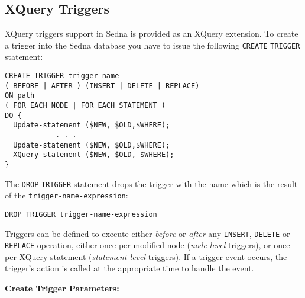 \documentclass[a4paper,12pt]{article}
\begin{document}
\subsection{XQuery Triggers}

XQuery triggers support in Sedna is provided as an XQuery extension. To create a
trigger into the Sedna database you have to issue the following \verb!CREATE!
\verb!TRIGGER! statement:

\begin{verbatim}
CREATE TRIGGER trigger-name
( BEFORE | AFTER ) (INSERT | DELETE | REPLACE)
ON path
( FOR EACH NODE | FOR EACH STATEMENT )
DO {
  Update-statement ($NEW, $OLD,$WHERE);
            . . .
  Update-statement ($NEW, $OLD,$WHERE);
  XQuery-statement ($NEW, $OLD, $WHERE);
}
\end{verbatim}

The \verb!DROP! \verb!TRIGGER! statement drops the trigger with the
name which is the result of the \verb!trigger-name-expression!:

\begin{verbatim}
DROP TRIGGER trigger-name-expression
\end{verbatim}

Triggers can be defined to execute either \emph{before} or \emph{after} any
\verb!INSERT!, \verb!DELETE! or \verb!REPLACE! operation, either once per
modified node (\emph{node-level} triggers), or once per XQuery statement
(\emph{statement-level} triggers). If a trigger event occurs, the trigger's
action is called at the appropriate time to handle the event.

\medskip
\noindent
\textbf{Create Trigger Parameters:}
\end{document}
